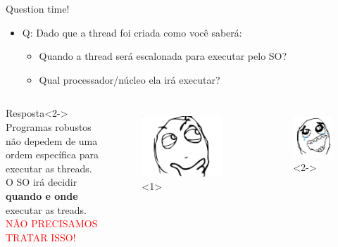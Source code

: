 \documentclass[10pt, xcolor=x11names]{beamer}
\begin{document}

\begin{frame}
	\begin{alertblock}{Question time!}

		\begin{itemize}
			\item Q: Dado que a thread foi criada como você saberá:
				\begin{itemize}
					\item Quando a thread será escalonada para executar pelo SO?
					\item Qual processador/núcleo ela irá executar?	
				\end{itemize}
		\end{itemize}
	\end{alertblock}

	\begin{columns}	
			\begin{block}{Resposta}<2->
				Programas robustos não depedem de uma ordem específica para executar as threads. \\
				O SO irá decidir \textbf{quando e onde} executar as treads. \\
				\textcolor{red}{NÃO PRECISAMOS TRATAR ISSO!}				
			\end{block}

			\begin{figure}
				\includegraphics[width=.55\linewidth]{img/question-meme.jpg}<1>
			\end{figure}	
			\begin{figure}
				\includegraphics[width=.55\linewidth]{img/question-answer.jpg}<2->
			\end{figure}
 			
	\end{columns}
\end{frame}
\end{document}
